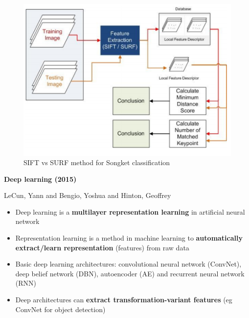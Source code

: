 \documentclass[10pt]{beamer}
\begin{document}
\begin{frame}{\cite{willy2013evaluation}}
	\begin{figure}
		\centering
		\includegraphics[width=.8\linewidth]{songket-sift-vs-surf-methodology}
		\caption{SIFT vs SURF method for Songket classification}
		\label{fig_songket_sift_vs_surf_methodology}
    \end{figure}
\end{frame}

\begin{frame}{\cite{lecun2015deep}}

	\textbf{Deep learning (2015)}
	
	{\small LeCun, Yann and Bengio, Yoshua and Hinton, Geoffrey}
	
	\begin{itemize}[<+->]
		
		\item Deep learning is a \textbf{multilayer representation learning} in artificial neural network
		
		\item Representation learning is a method in machine learning to \textbf{automatically extract/learn representation} (features) from raw data
		
		\item Basic deep learning architectures: convolutional neural network (ConvNet), deep belief network (DBN), autoencoder (AE) and recurrent neural network (RNN)
		
		\item Deep architectures can \textbf{extract transformation-variant features} (eg ConvNet for object detection)
		
		
	\end{itemize}
	
\end{frame}
\end{document}
